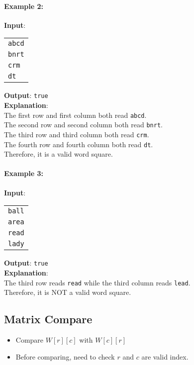  

\paragraph{Example 2:}

\begin{flushleft}
\textbf{Input}:
\begin{table}[H]
\begin{tabular}{l}
\texttt{abcd} \\
\texttt{bnrt} \\
\texttt{crm} \\
\texttt{dt}
\end{tabular}
\end{table}

\textbf{Output}: \texttt{true}
\\
\textbf{Explanation}:
\\
The first row and first column both read \texttt{abcd}.
\\
The second row and second column both read \texttt{bnrt}.
\\
The third row and third column both read \texttt{crm}.
\\
The fourth row and fourth column both read \texttt{dt}.
\\
Therefore, it is a valid word square.
\end{flushleft}


\paragraph{Example 3:}
\begin{flushleft}
\textbf{Input}:
\begin{table}[H]
\begin{tabular}{l}
  \texttt{ball} \\
  \texttt{area} \\
  \texttt{read} \\
  \texttt{lady}
\end{tabular}
\end{table}
\textbf{Output}: \texttt{true}
\\
\textbf{Explanation}:
\\
The third row reads \texttt{read} while the third column reads \texttt{lead}.
\\
Therefore, it is NOT a valid word square.
\end{flushleft}

\subsection{Matrix Compare}
\begin{itemize}
\item Compare $W[r][c]$ with $W[c][r]$
\item Before comparing, need to check $r$ and $c$ are valid index.
\end{itemize}

